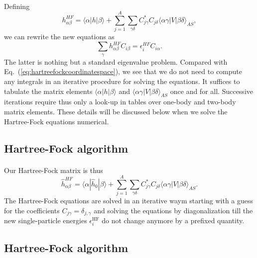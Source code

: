 \documentclass[%
twoside,                 %
final,                   %
10pt]{article}
\begin{document}
\paragraph{}
Defining 
\[
h_{\alpha\beta}^{HF}=\langle \alpha | h | \beta \rangle+
\sum_{j=1}^A\sum_{\gamma\delta} C^*_{j\gamma}C_{j\delta}\langle \alpha\gamma|V|\beta\delta\rangle_{AS},
\]
we can rewrite the new equations as 
\begin{equation}
\sum_{\gamma}h_{\alpha\beta}^{HF}C_{i\beta}=\epsilon_i^{HF}C_{i\alpha}. \label{eq:newhf}
\end{equation}
The latter is nothing but a standard eigenvalue problem. Compared with Eq.~(\ref{eq:hartreefockcoordinatespace}),
we see that we do not need to compute any integrals in an iterative procedure for solving the equations.
It suffices to tabulate the matrix elements $\langle \alpha | h | \beta \rangle$ and $\langle \alpha\gamma|V|\beta\delta\rangle_{AS}$ once and for all. Successive iterations require thus only a look-up in tables over one-body and two-body matrix elements. These details will be discussed below when we solve the Hartree-Fock equations numerical.



\subsection*{Hartree-Fock algorithm}

\paragraph{}
Our Hartree-Fock matrix  is thus
\[
\hat{h}_{\alpha\beta}^{HF}=\langle \alpha | \hat{h}_0 | \beta \rangle+
\sum_{j=1}^A\sum_{\gamma\delta} C^*_{j\gamma}C_{j\delta}\langle \alpha\gamma|V|\beta\delta\rangle_{AS}.
\]
The Hartree-Fock equations are solved in an iterative waym starting with a guess for the coefficients $C_{j\gamma}=\delta_{j,\gamma}$ and solving the equations by diagonalization till the new single-particle energies
$\epsilon_i^{\mathrm{HF}}$ do not change anymore by a prefixed quantity.



\subsection*{Hartree-Fock algorithm}

\end{document}
